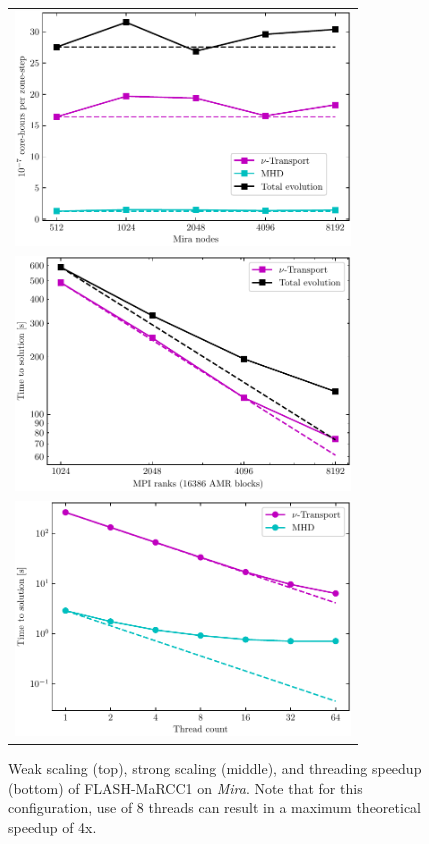 \begin{figure}

  \begin{tabular}{c}
    \includegraphics[width=3.5in]{figs/wkScaleSparkM1} \\
    \includegraphics[width=3.5in]{figs/strScaleSparkM1} \\
    \includegraphics[width=3.5in]{figs/thrdSpeedupSparkM1}
  \end{tabular}
  \caption{Weak scaling (top), strong scaling (middle), and threading
  speedup (bottom) of FLASH-MaRCC1 on {\it Mira}.  Note that for this configuration, use of 8 threads can result in a maximum theoretical speedup of 4x.}
  \label{fig:scaling}
\end{figure}
